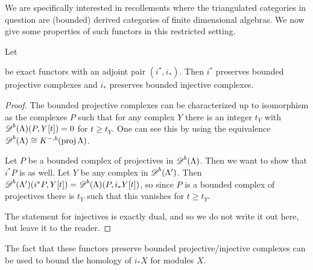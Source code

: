 We are specifically interested in recollements where the triangulated categories in question are (bounded) derived categories of finite dimensional algebras. We now give some properties of such functors in this restricted setting.

\begin{lemma} \label{lem:adjoint_preserves_bounded_proj/inj}
	Let  be exact functors with an adjoint pair $(i^*,i_*)$. Then $i^*$ preserves bounded projective complexes and $i_*$ preserves bounded injective complexes.
	\begin{proof}
		The bounded projective complexes can be characterized up to isomorphism as the complexes $P$ such that for any complex $Y$ there is an integer $t_Y$ with $\operatorname{\mathscr{D}}^b(\Lambda) (P, Y[t])=0$ for $t\geq t_Y$. One can see this by using the equivalence $\operatorname{\mathscr{D}}^b(\Lambda) \cong K^{-,b}(\operatorname{proj}\Lambda)$.
		
		Let $P$ be a bounded complex of projectives in $\operatorname{\mathscr{D}}^b(\Lambda)$. Then we want to show that $i^*P$ is as well. Let $Y$ be any complex in $\operatorname{\mathscr{D}}^b(\Lambda')$. Then $\operatorname{\mathscr{D}}^b(\Lambda')(i^*P, Y[t]) = \operatorname{\mathscr{D}}^b(\Lambda)(P, i_*Y[t])$, so since $P$ is a bounded complex of projectives there is $t_Y$ such that this vanishes for $t \geq t_Y$. 
		
		The statement for injectives is exactly dual, and so we do not write it out here, but leave it to the reader.
	\end{proof}
\end{lemma}

The fact that these functors preserve bounded projective/injective complexes can be used to bound the homology of $i_*X$ for modules $X$.

